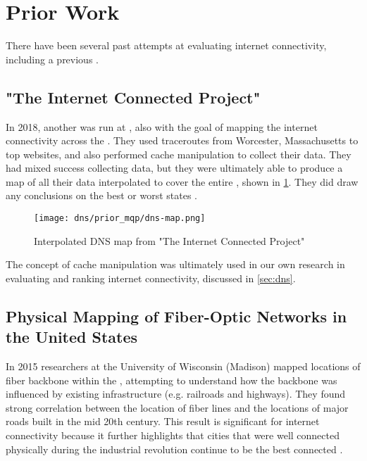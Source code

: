 \section{Prior Work}\label{sec:background_prior_work}

There have been several past attempts at evaluating \us internet connectivity, including a previous \wpi \mqp.

 
\subsection{"The Internet Connected Project"}
In 2018, another \mqp was run at \wpi, also with the goal of mapping the internet connectivity across the \us. They used traceroutes from Worcester, Massachusetts to top websites, and also performed \dns cache manipulation to collect their data. They had mixed success collecting data, but they were ultimately able to produce a map of all their \dns data interpolated to cover the entire \us, shown in \cref{fig:interpolated_dns_map}. They did draw any conclusions on the best or worst states \cite{Fakult2019}.

\begin{figure}[h]
    \centering
    \texttt{[image: dns/prior\_mqp/dns-map.png]}
    \caption{Interpolated DNS map from "The Internet Connected Project"\cite{Fakult2019}}
    \label{fig:interpolated_dns_map}
\end{figure}

The concept of \dns cache manipulation was ultimately used in our own research in evaluating and ranking internet connectivity, discussed in \cref{sec:dns}.

\subsection{Physical Mapping of Fiber-Optic Networks in the United States}
In 2015 researchers at the University of Wisconsin (Madison) mapped locations of fiber backbone within the \us, attempting to understand how the backbone was influenced by existing infrastructure (e.g. railroads and highways). They found strong correlation between the location of fiber lines and the locations of major roads built in the mid 20th century. This result is significant for internet connectivity because it further highlights that cities that were well connected physically during the industrial revolution continue to be the best connected \cite{Durairajan2015a}.
 